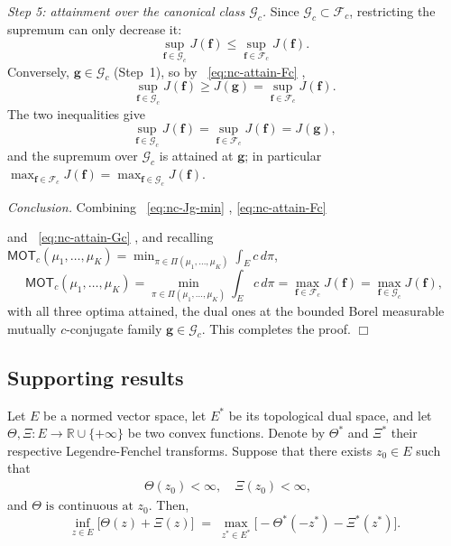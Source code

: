 \documentclass[twoside,11pt,a4paper]{article}
\newcommand*{\SavedEqref}{}
\let\SavedEqref\eqref
\renewcommand*{\eqref}[1]{  \begingroup
    \hypersetup{
      linkcolor=linkequation,
      linkbordercolor=linkequation,
    }    \SavedEqref{#1}  \endgroup
}
\begin{document}
\medskip
\noindent\emph{Step 5: attainment over the canonical class $\mathcal G_c$.}
Since $\mathcal G_c\subset\mathcal F_c$, restricting the supremum can only
decrease it:
\[
\sup_{\boldsymbol f\in\mathcal G_c}J(\boldsymbol f)
\le\sup_{\boldsymbol f\in\mathcal F_c}J(\boldsymbol f).
\]
Conversely, $\boldsymbol g\in\mathcal G_c$ (Step~1), so by~\eqref{eq:nc-attain-Fc},
\[
\sup_{\boldsymbol f\in\mathcal G_c}J(\boldsymbol f)
\ge J(\boldsymbol g)
=\sup_{\boldsymbol f\in\mathcal F_c}J(\boldsymbol f).
\]
The two inequalities give
\begin{equation}\label{eq:nc-attain-Gc}
\sup_{\boldsymbol f\in\mathcal G_c}J(\boldsymbol f)
=\sup_{\boldsymbol f\in\mathcal F_c}J(\boldsymbol f)
=J(\boldsymbol g),
\end{equation}
and the supremum over $\mathcal G_c$ is attained at $\boldsymbol g$; in particular
$\max_{\boldsymbol f\in\mathcal F_c}J(\boldsymbol f)=\max_{\boldsymbol f\in\mathcal G_c}J(\boldsymbol f)$.

\medskip
\noindent\emph{Conclusion.}
Combining~\eqref{eq:nc-Jg-min}, \eqref{eq:nc-attain-Fc}
and~\eqref{eq:nc-attain-Gc}, and recalling
$\mathsf{MOT}_c(\mu_1,\dots,\mu_K)=\min_{\pi\in\Pi(\mu_1,\dots,\mu_K)}\int_E c\,d\pi$,
\[
\mathsf{MOT}_c(\mu_1,\dots,\mu_K)
=\min_{\pi\in\Pi(\mu_1,\dots,\mu_K)}\int_{E} c\,d\pi
=\max_{\boldsymbol f\in\mathcal F_c}J(\boldsymbol f)
=\max_{\boldsymbol f\in\mathcal G_c}J(\boldsymbol f),
\]
with all three optima attained, the dual ones at the bounded Borel measurable
mutually $c$-conjugate family $\boldsymbol g\in\mathcal G_c$. This completes the
proof.
\hfill\(\Box\)















\subsection{Supporting results}


\begin{theorem}\label{fenchell}
Let $E$ be a normed vector space, let $E^*$ be its topological dual space, and let 
$\Theta, \Xi : E \to \mathbb{R} \cup \{+\infty\}$ be two convex functions.
Denote by $\Theta^*$ and $\Xi^*$ their respective Legendre-Fenchel transforms.
Suppose that there exists $z_0 \in E$ such that 
\begin{align*}
    \Theta(z_0) < \infty, \quad \Xi(z_0) < \infty,
    \quad 
\end{align*}
and $\Theta \text{ is continuous at } z_0$. Then,
\begin{equation*}
    \inf_{z \in E} \big[ \Theta(z) + \Xi(z) \big]
    \;=\;
    \max_{z^* \in E^*} \big[ -\Theta^*(-z^*) - \Xi^*(z^*) \big].
\end{equation*}
\end{theorem}
\end{document}
